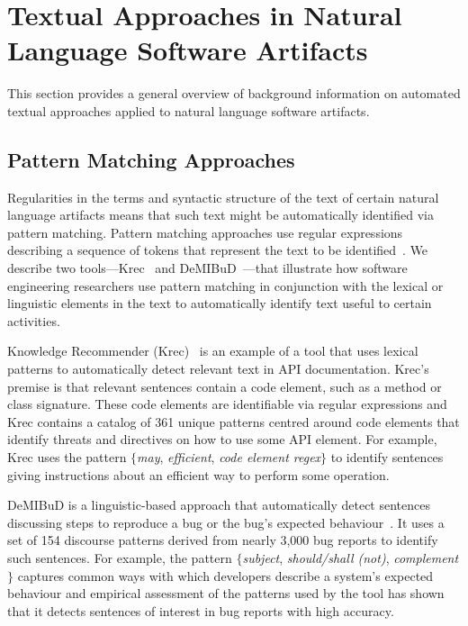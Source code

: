 

\section{Textual Approaches in Natural Language Software Artifacts}
\label{cp2:general-approaches}


This section provides a general overview of 
background information on automated textual approaches
applied to natural language software artifacts. 




\subsection{Pattern Matching Approaches}
\label{cp2:pattern-matching}


Regularities in the terms and syntactic structure of the text of certain natural language artifacts
means that such text might be automatically identified via pattern matching.
Pattern matching approaches use regular expressions describing a sequence of tokens that represent
 the text to be identified~\cite{Bavota2016}. 
 We describe two tools---Krec~\cite{Robillard2015}  and DeMIBuD~\cite{Chaparro2017}---that
 illustrate how software engineering 
 researchers use pattern matching in conjunction with the lexical or linguistic elements 
 in the text to automatically identify 
 text useful to certain activities.
    


Knowledge Recommender (Krec)~\cite{Robillard2015} 
is an example of a
 tool that uses lexical patterns to 
 automatically detect relevant text in  API documentation. 
Krec's premise is that relevant sentences contain a code element, such as a method or class signature.
These code elements are identifiable via regular expressions 
and Krec contains a catalog of 361 unique patterns centred around code elements
that identify threats and directives on how to use some API element.
For example, Krec uses the pattern {\small \textit{$\{$may}, \textit{efficient}, \textit{code element regex$\}$}} 
to identify sentences giving instructions about an efficient way to 
perform some operation. 



{\small DeMIBuD} is a linguistic-based approach that 
automatically detect sentences discussing steps to reproduce 
a bug or the bug's expected behaviour~\cite{Chaparro2017}.
It uses a set of 154 discourse patterns
derived from nearly 3,000 bug reports 
to identify such sentences. 
For example, the pattern 
{\small \textit{$\{$subject}, \textit{should/shall (not)}, \textit{complement$\}$}}
captures common ways with which developers describe a system's expected behaviour
and empirical assessment of the patterns used by the tool has shown that it 
detects sentences of interest in bug reports with high accuracy.






